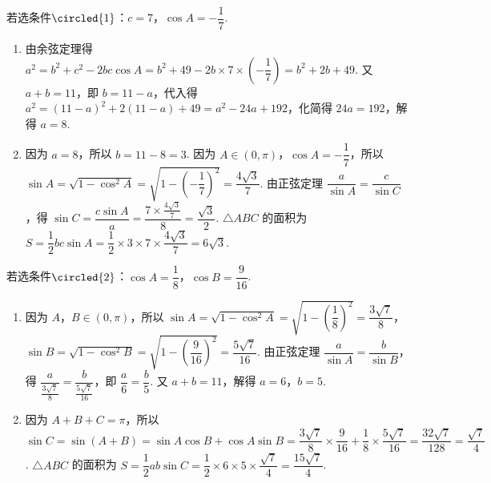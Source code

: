 \begin{solution}
若选条件\(\circled{1}\)：\(c=7\)，\(\cos A=-\dfrac17\).
\begin{enumerate}
    \item 由余弦定理得 \(a^2=b^2+c^2-2bc\cos A=b^2+49-2b\times7\times\left(-\dfrac17\right)=b^2+2b+49\). 又 \(a+b=11\)，即 \(b=11-a\)，代入得 \(a^2=(11-a)^2+2(11-a)+49=a^2-24a+192\)，化简得 \(24a=192\)，解得 \(a=8\).
    \item 因为 \(a=8\)，所以 \(b=11-8=3\). 因为 \(A\in(0,\pi)\)，\(\cos A=-\dfrac17\)，所以 \(\sin A=\sqrt{1-\cos^2 A}=\sqrt{1-\left(-\dfrac17\right)^2}=\dfrac{4\sqrt3}{7}\). 由正弦定理 \(\dfrac{a}{\sin A}=\dfrac{c}{\sin C}\)，得 \(\sin C=\dfrac{c\sin A}{a}=\dfrac{7\times\frac{4\sqrt3}{7}}{8}=\dfrac{\sqrt3}{2}\). \(\triangle ABC\) 的面积为 \(S=\dfrac12 bc\sin A=\dfrac12\times3\times7\times\dfrac{4\sqrt3}{7}=6\sqrt3\).
\end{enumerate}

若选条件\(\circled{2}\)：\(\cos A=\dfrac18\)，\(\cos B=\dfrac{9}{16}\).
\begin{enumerate}
    \item 因为 \(A\)，\(B\in(0,\pi)\)，所以 \(\sin A=\sqrt{1-\cos^2 A}=\sqrt{1-\left(\dfrac18\right)^2}=\dfrac{3\sqrt7}{8}\)，\(\sin B=\sqrt{1-\cos^2 B}=\sqrt{1-\left(\dfrac{9}{16}\right)^2}=\dfrac{5\sqrt7}{16}\). 由正弦定理 \(\dfrac{a}{\sin A}=\dfrac{b}{\sin B}\)，得 \(\dfrac{a}{\frac{3\sqrt7}{8}}=\dfrac{b}{\frac{5\sqrt7}{16}}\)，即 \(\dfrac a6=\dfrac b5\). 又 \(a+b=11\)，解得 \(a=6\)，\(b=5\).
    \item 因为 \(A+B+C=\pi\)，所以 \(\sin C=\sin(A+B)=\sin A\cos B+\cos A\sin B=\dfrac{3\sqrt7}{8}\times\dfrac{9}{16}+\dfrac18\times\dfrac{5\sqrt7}{16}=\dfrac{32\sqrt7}{128}=\dfrac{\sqrt7}{4}\). \(\triangle ABC\) 的面积为 \(S=\dfrac12 ab\sin C=\dfrac12\times6\times5\times\dfrac{\sqrt7}{4}=\dfrac{15\sqrt7}{4}\).
\end{enumerate}
\end{solution}

